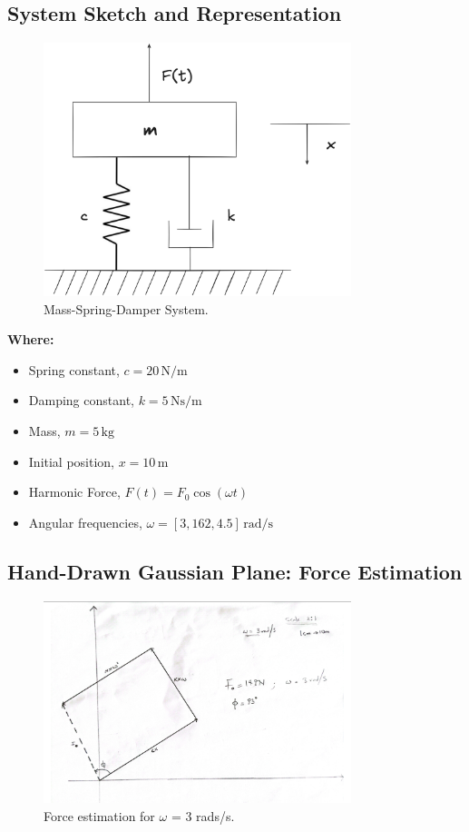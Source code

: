 \documentclass[12pt,a4paper]{article}
\begin{document}
\subsection{System Sketch and Representation}
\begin{figure}[H]
    \centering
    \includegraphics[width=0.8\textwidth]{msd_harmonic.png} 
    \caption{Mass-Spring-Damper System.}
    \label{fig:system}
\end{figure}
\textbf{Where:}
\begin{itemize}
    \item Spring constant, \(c = 20 \, \text{N/m}\)
    \item Damping constant, \(k = 5 \, \text{Ns/m}\)
    \item Mass, \(m = 5 \, \text{kg}\)
    \item Initial position, \(x = 10 \, \text{m}\)
    \item Harmonic Force, \(F(t) = F_0 \cos(\omega t)\)
    \item Angular frequencies, \(\omega = [3, 162, 4.5] \, \text{rad/s}\)
\end{itemize}

\subsection{Hand-Drawn Gaussian Plane: Force Estimation}

\begin{figure}[H]
    \centering
    \includegraphics[width=0.8\textwidth]{3rads.png} 
    \caption{Force estimation for $\omega$ = 3 rads/s.}
    \label{fig:system}
\end{figure}
\end{document}
